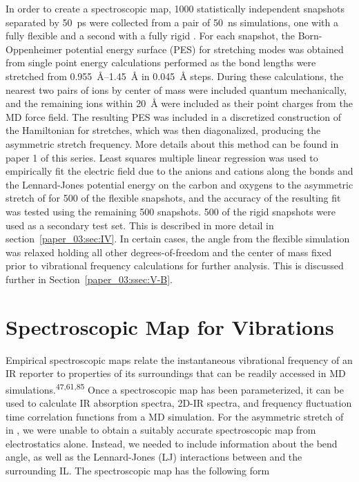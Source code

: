 \documentclass[]{article}
\begin{document}
In order to create a spectroscopic map, \num{1000} statistically independent snapshots separated by \SI{50}{\pico\second} were collected from a pair of \SI{50}{\nano\second} simulations, one with a fully flexible  and a second with a fully rigid . For each snapshot, the Born-Oppenheimer potential energy surface (PES) for  stretching modes was obtained from single point energy calculations performed as the  bond lengths were stretched from \SIrange{0.955}{1.45}{\angstrom} in \SI{0.045}{\angstrom} steps. During these calculations, the nearest two pairs of ions by center of mass were included quantum mechanically, and the remaining ions within \SI{20}{\angstrom} were included as their point charges from the MD force field. The resulting PES was included in a discretized construction of the Hamiltonian for  stretches, which was then diagonalized, producing the asymmetric stretch frequency. More details about this method can be found in paper 1 of this series. Least squares multiple linear regression was used to empirically fit the electric field due to the anions and cations along the  bonds and the Lennard-Jones potential energy on the  carbon and oxygens to the asymmetric stretch of  for \num{500} of the flexible snapshots, and the accuracy of the resulting fit was tested using the remaining \num{500} snapshots. \num{500} of the rigid snapshots were used as a secondary test set. This is described in more detail in section~\ref{paper_03:sec:IV}. In certain cases, the  angle from the flexible simulation was relaxed holding all other degrees-of-freedom and the  center of mass fixed prior to vibrational frequency calculations for further analysis. This is discussed further in Section~\ref{paper_03:ssec:V-B}.

\section{Spectroscopic Map for  Vibrations}
\label{paper_03:sec:III}

Empirical spectroscopic maps relate the instantaneous vibrational frequency of an IR reporter to properties of its surroundings that can be readily accessed in MD simulations.\textsuperscript{47,61,85} Once a spectroscopic map has been parameterized, it can be used to calculate IR absorption spectra, 2D-IR spectra, and frequency fluctuation time correlation functions from a MD simulation. For the asymmetric stretch of  in \ce{[C4C1im][PF6]}, we were unable to obtain a suitably accurate spectroscopic map from electrostatics alone. Instead, we needed to include information about the  bend angle, as well as the Lennard-Jones (LJ) interactions between  and the surrounding IL. The spectroscopic map has the following form
\end{document}
